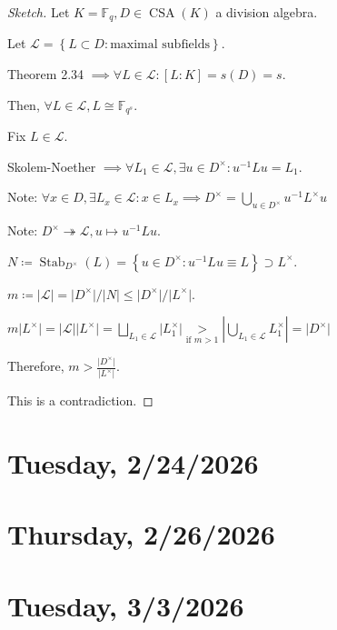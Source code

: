 \documentclass{article}
\theoremstyle{definition}
\theoremstyle{plain}
\theoremstyle{remark}
\begin{document}
    \begin{proof}
        [Sketch]

        Let \(K = \mathbb{F}_q , D \in \operatorname{CSA}(K)\) a division algebra.

        Let \(\mathscr{L} = \left\{ L \subset D : \text{maximal subfields} \right\} \).

        Theorem 2.34 \(\implies \forall L \in \mathscr{L} : [L:K] = s(D) = s\).

        Then, \(\forall L \in \mathscr{L}, L \cong \mathbb{F}_{q^s}\).

        Fix \(L\in \mathscr{L}\).

        Skolem-Noether \(\implies \forall L_1 \in \mathscr{L}, \exists u\in D^\times : u ^{-1} L u = L_1\).
        
        Note: \(\forall x \in D, \exists L_x \in \mathscr{L} : x \in L_x \implies D^\times = \bigcup_{u\in D^\times} u ^{-1} L^\times u\) 

        Note: \(D^\times \twoheadrightarrow \mathscr{L}, u \mapsto u ^{-1} L u\).

        \(N \coloneqq \operatorname{Stab}_{D^\times}(L) = \left\{ u \in D^\times : u ^{-1} L u \equiv  L \right\} \supset L^\times\).

        \(m \coloneqq \vert \mathscr{L} \vert = \vert D^\times  \vert / \vert N \vert \leq \vert D^\times  \vert / \vert L^\times \vert\).

        \(m \vert L^\times \vert = \vert \mathscr{L} \vert \vert L^\times \vert  = \bigsqcup_{L_1 \in \mathscr{L}} \vert L_1^\times \vert \underset{\text{if } m > 1}{>} \left\vert \bigcup_{L_1 \in \mathscr{L}} L_1^\times \right\vert = \vert D^\times \vert \)
        
        Therefore, \(m > \frac{\vert D^\times \vert}{\vert L^\times \vert}\).

        This is a contradiction.

    \end{proof}

    \section*{Tuesday, 2/24/2026}
    
    \section*{Thursday, 2/26/2026}
    
    \section*{Tuesday, 3/3/2026}
    
\end{document}
